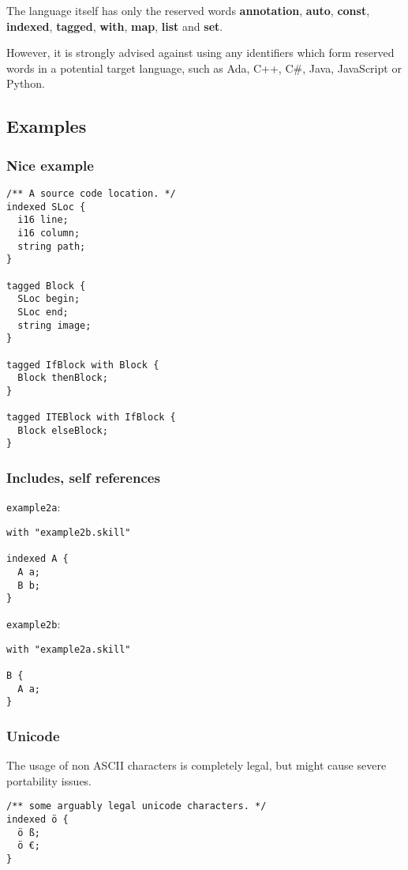 \documentclass[a4paper,10pt]{article}
\begin{document}
The language itself has only the reserved words \textbf{annotation}, \textbf{auto}, \textbf{const}, \textbf{indexed}, \textbf{tagged}, \textbf{with}, \textbf{map}, \textbf{list} and \textbf{set}.

However, it is strongly advised against using any identifiers which form reserved words in a potential target language, such as Ada, C++, C\#, Java, JavaScript or Python.

\subsection{Examples}

\subsubsection*{Nice example}
\begin{verbatim}
/** A source code location. */
indexed SLoc {
  i16 line;
  i16 column;
  string path;
}

tagged Block {
  SLoc begin;
  SLoc end;
  string image;
}

tagged IfBlock with Block {
  Block thenBlock;
}

tagged ITEBlock with IfBlock {
  Block elseBlock;
}
\end{verbatim}

\subsubsection*{Includes, self references}

\texttt{example2a}:
\begin{verbatim}
with "example2b.skill"

indexed A {
  A a;
  B b;
}
\end{verbatim}

\texttt{example2b}:
\begin{verbatim}
with "example2a.skill"

B {
  A a;
}
\end{verbatim}

\subsubsection*{Unicode}
The usage of non ASCII characters is completely legal, but might cause severe portability issues.
\begin{verbatim}
/** some arguably legal unicode characters. */
indexed ö {
  ö ß;
  ö €;
}
\end{verbatim}
\end{document}
